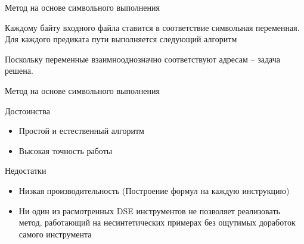 \documentclass[10pt]{beamer}
\begin{document}
\begin{frame}{Метод на основе символьного выполнения}

Каждому байту входного файла ставится в соответствие символьная переменная.
Для каждого предиката пути выполняется следующий алгоритм

\begin{algorithm}[H]
\SetAlgoLined
{}
  \caption{Метод на основе символьного выполнения}
\end{algorithm}
Поскольку переменные взаимнооднозначно соответствуют адресам -- задача решена.
\end{frame}


\begin{frame}{Метод на основе символьного выполнения}

\begin{block}{Достоинства}
  \begin{itemize}
    \item Простой и естественный алгоритм
    \item Высокая точность работы
  \end{itemize}
\end{block}

\begin{block}{Недостатки}
  \begin{itemize}
    \item Низкая производительность (Построение формул на каждую инструкцию)
    \item Ни один из расмотренных DSE инструментов не позволяет реализовать метод, работающий на несинтетических примерах без ощутимых доработок самого инструмента
  \end{itemize}
\end{block}

\end{frame}
\end{document}
